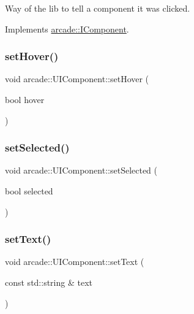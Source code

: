 Way of the lib to tell a component it was clicked. 



Implements \hyperlink{classarcade_1_1_i_component_ae0cd9b58ad0b127c671a5d8f92d9c25f}{arcade\+::\+I\+Component}.

\mbox{\label{classarcade_1_1_u_i_component_a08ab8e887fe7f5337ac0e87a82105e37}} 
\subsubsection{\texorpdfstring{set\+Hover()}{setHover()}}
{\footnotesize\ttfamily void arcade\+::\+U\+I\+Component\+::set\+Hover (\begin{DoxyParamCaption}\item[{bool}]{hover }\end{DoxyParamCaption})}

\mbox{\label{classarcade_1_1_u_i_component_aa09f60dbf12dcb42e15b7a23ae61bf74}} 
\subsubsection{\texorpdfstring{set\+Selected()}{setSelected()}}
{\footnotesize\ttfamily void arcade\+::\+U\+I\+Component\+::set\+Selected (\begin{DoxyParamCaption}\item[{bool}]{selected }\end{DoxyParamCaption})}

\mbox{\label{classarcade_1_1_u_i_component_abf7a2ca878ba0963e2c3ac17207f0622}} 
\subsubsection{\texorpdfstring{set\+Text()}{setText()}}
{\footnotesize\ttfamily void arcade\+::\+U\+I\+Component\+::set\+Text (\begin{DoxyParamCaption}\item[{const std\+::string \&}]{text }\end{DoxyParamCaption})}


